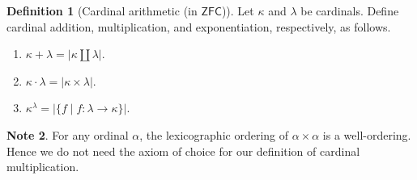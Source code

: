 \documentclass[10pt,letterpaper,cm]{nupset}
\theoremstyle{definition}
\newtheorem{definition}{Definition}[subsection]
\newtheorem{note}[definition]{Note}
\theoremstyle{theorem}
\theoremstyle{remark}
\newcommand{\1}{\mathbf{1}}
\newcommand{\0}{\vec 0}
\newcommand{\zfc}{\mathsf{ZFC}}
\begin{document}
\begin{definition}[Cardinal arithmetic (in $\zfc$)] Let $\kappa$ and $\lambda$ be cardinals. Define cardinal addition, multiplication, and exponentiation, respectively, as follows.
\begin{enumerate}
\item $\kappa + \lambda = \left\lvert{\kappa \coprod \lambda}\right\rvert$.
\item $\kappa \cdot \lambda = \left\lvert{\kappa \times \lambda}\right\rvert $.
\item $\kappa^{\lambda} = \left\lvert{\{f \mid f : \lambda \to \kappa \}}\right\rvert$.
\end{enumerate} 
\end{definition}

\begin{note}
For any ordinal $\alpha$,  the lexicographic ordering of $\alpha \times \alpha$ is a well-ordering. Hence we do not need the axiom of choice for our definition of cardinal multiplication. 
\end{note}
\end{document}
